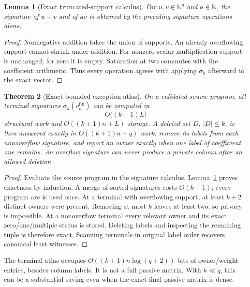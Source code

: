 \documentclass[11pt,letterpaper]{article}
\newtheorem{theorem}{Theorem}[section]
\newtheorem{lemma}[theorem]{Lemma}
\theoremstyle{definition}
\newcommand{\N}{\mathbb N}
\begin{document}
\begin{lemma}[Exact truncated-support calculus]\label{lem:atlasalgebra}
For $u,v\in\N^q$ and $a\in\N$, the signature of $u+v$ and of $av$ is obtained by the preceding signature operations alone.
\end{lemma}
\begin{proof}
Nonnegative addition takes the union of supports. An already overflowing support cannot shrink under addition. For nonzero scalar multiplication support is unchanged; for zero it is empty. Saturation at two commutes with the coefficient arithmetic. Thus every operation agrees with applying $\sigma_k$ afterward to the exact vector.
\end{proof}

\begin{theorem}[Exact bounded-exception atlas]\label{thm:atlas}
On a validated source program, all terminal signatures $\sigma_k(v_h^{\mathrm{fin}})$ can be computed in
\[
 O\bigl((k+1)L\bigr)
\]
structural work and $O((k+1)n+L)$ storage. A deleted set $D$, $|D|\le k$, is then answered exactly in $O((k+1)n+q)$ work: remove its labels from each nonoverflow signature, and report an owner exactly when one label of coefficient one remains. An overflow signature can never produce a private column after an allowed deletion.
\end{theorem}
\begin{proof}
Evaluate the source program in the signature calculus. Lemma~\ref{lem:atlasalgebra} proves exactness by induction. A merge of sorted signatures costs $O(k+1)$; every program arc is used once. At a terminal with overflowing support, at least $k+2$ distinct owners were present. Removing at most $k$ leaves at least two, so privacy is impossible. At a nonoverflow terminal every relevant owner and its exact zero/one/multiple status is stored. Deleting labels and inspecting the remaining tuple is therefore exact. Scanning terminals in original label order recovers canonical least witnesses.
\end{proof}

The terminal atlas occupies $O((k+1)n\log(q+2))$ bits of owner/weight entries, besides column labels. It is not a full passive matrix. With $k\ll q$, this can be a substantial saving even when the exact final passive matrix is dense.
\end{document}
